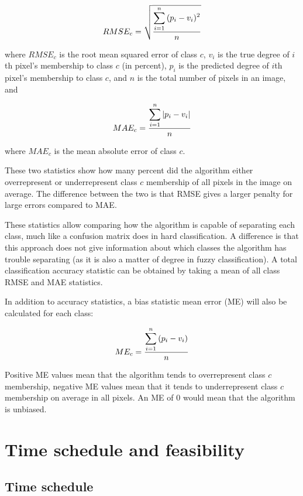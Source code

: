 \documentclass[a4paper,10pt]{article}
\begin{document}
$$ RMSE_c = \sqrt{ \displaystyle\sum_{i=1}^{n}{ (p_{i} - v_{i})^2 } \over{n} } $$

where $ RMSE_c $ is the root mean squared error of class $ c $, $ v_{i} $ is the true degree of $ i $th pixel's membership to class $ c $ (in percent), $ p_i $ is the predicted degree of $ i $th pixel's membership to class $ c $, and $ n $ is the total number of pixels in an image, and

$$ MAE_c = {\displaystyle\sum_{i=1}^{n}{ |p_{i} - v_{i}| } \over{n}} $$

where $ MAE_c $ is the mean absolute error of class $ c $.

These two statistics show how many percent did the algorithm either overrepresent or underrepresent class $ c $ membership of all pixels in the image on average. The difference between the two is that RMSE gives a larger penalty for large errors compared to MAE.

These statistics allow comparing how the algorithm is capable of separating each class, much like a confusion matrix does in hard classification. A difference is that this approach does not give information about which classes the algorithm has trouble separating (as it is also a matter of degree in fuzzy classification). A total classification accuracy statistic can be obtained by taking a mean of all class RMSE and MAE statistics.

In addition to accuracy statistics, a bias statistic mean error (ME) will also be calculated for each class:

$$ ME_c = {\displaystyle\sum_{i=1}^{n}{ (p_{i} - v_{i}) } \over{n}} $$

Positive ME values mean that the algorithm tends to overrepresent class $c$ membership, negative ME values mean that it tends to underrepresent class $c$ membership on average in all pixels. An ME of 0 would mean that the algorithm is unbiased.

\section{Time schedule and feasibility}

\subsection{Time schedule}
\end{document}
